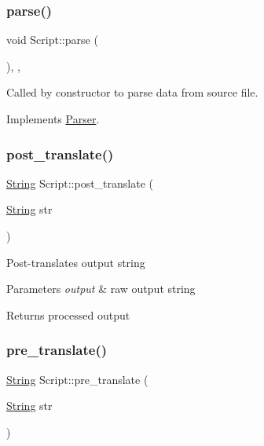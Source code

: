 \subsubsection{\texorpdfstring{parse()}{parse()}}
{\footnotesize\ttfamily void Script\+::parse (\begin{DoxyParamCaption}{ }\end{DoxyParamCaption})\hspace{0.3cm}{\ttfamily [override]}, {\ttfamily [private]}, {\ttfamily [virtual]}}

Called by constructor to parse data from source file. 

Implements \mbox{\hyperlink{classParser_a1df9aa58be0f4027a39277d78b870195}{Parser}}.

\mbox{\label{classScript_a754cc2f448013d0a3b400088e460fbe4}} 
\subsubsection{\texorpdfstring{post\+\_\+translate()}{post\_translate()}}
{\footnotesize\ttfamily \mbox{\hyperlink{classString}{String}} Script\+::post\+\_\+translate (\begin{DoxyParamCaption}\item[{\mbox{\hyperlink{classString}{String}}}]{str }\end{DoxyParamCaption})}

Post-\/translates output string 
\begin{DoxyParams}{Parameters}
{\em output} & raw output string \\
\hline
\end{DoxyParams}
\begin{DoxyReturn}{Returns}
processed output 
\end{DoxyReturn}
\mbox{\label{classScript_af94dd912c6276f5130d13740d775200c}} 
\subsubsection{\texorpdfstring{pre\+\_\+translate()}{pre\_translate()}}
{\footnotesize\ttfamily \mbox{\hyperlink{classString}{String}} Script\+::pre\+\_\+translate (\begin{DoxyParamCaption}\item[{\mbox{\hyperlink{classString}{String}}}]{str }\end{DoxyParamCaption})}

